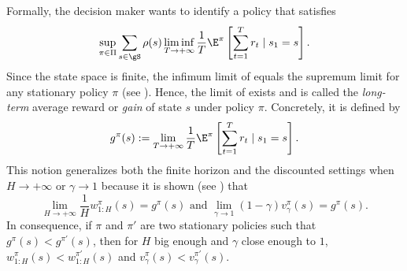 Formally, the decision maker wants to identify a policy that satisfies
\begin{equation}
    \label{eq:avg_obj}
    \sup_{\pi\in\Pi}\sum_{s\in\gS}\rho(s)\liminf_{T\to+\infty}\frac1T \E^\pi\left[ \sum_{t=1}^{T} r_t \mid s_1=s\right].
\end{equation}
Since the state space is finite, the infimum limit of  equals the supremum limit for any stationary policy $\pi$ (see \cite[Chapter~8]{puterman2014markov}).
Hence, the limit of  exists and is called the \emph{long-term} average reward or \emph{gain} of state $s$ under policy $\pi$.
Concretely, it is defined by
\begin{equation}
    \label{eq:gain_defn}
    g^\pi(s) := \lim_{T\to+\infty}\frac1T \E^\pi\left[ \sum_{t=1}^{T} r_t \mid s_1=s\right].
\end{equation}
This notion generalizes both the finite horizon and the discounted settings when $H\to+\infty$ or $\gamma\to1$ because it is shown (see \cite[Sections~8.2.1 and 8.2.2]{puterman2014markov}) that 
\begin{equation}
    \label{ch:mdp:eq:equi_gain_value}
    \lim_{H\to+\infty}\frac1H w^\pi_{1:H}(s) =g^\pi(s) \text{ and }
    \lim_{\gamma\to1}(1-\gamma)v^\pi_\gamma(s) =g^\pi(s).
\end{equation}
In consequence, if $\pi$ and $\pi'$ are two stationary policies such that $g^\pi(s)< g^{\pi'}(s)$, then for $H$ big enough and $\gamma$ close enough to $1$, $w_{1:H}^\pi(s)< w_{1:H}^{\pi'}(s)$ and $v^\pi_\gamma(s)< v^{\pi'}_\gamma(s)$.

